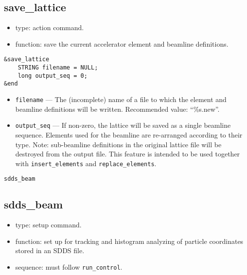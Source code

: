 \documentclass[11pt]{article}
\begin{document}
\subsection{save\_lattice \label{subsec:savelattice}}

\begin{itemize}
\item type: action command.
\item function: save the current accelerator element and beamline definitions.
\end{itemize}

\begin{verbatim}
&save_lattice
    STRING filename = NULL;
    long output_seq = 0;
&end
\end{verbatim}

\begin{itemize}
\item \verb|filename| --- The (incomplete) name of a file to which the element and beamline definitions
will be written.  Recommended value: ``\%s.new''.
\item \verb|output_seq| --- If non-zero, the lattice will be saved as a single beamline sequence.
Elements used for the beamline are re-arranged according to their type. Note: 
sub-beamline definitions in the original lattice file will be destroyed from the output file.
This feature is intended to be used 
together with \verb|insert_elements| and \verb|replace_elements|. 
\end{itemize}

\newpage
\begin{center}{\Large\verb|sdds_beam|}\end{center}
\subsection{sdds\_beam \label{subsec:sddsbeam}}

\begin{itemize}
\item type: setup command.
\item function: set up for tracking and histogram analyzing of particle coordinates stored in an SDDS file.
\item sequence: must follow \verb|run_control|.
\end{itemize}
\end{document}
